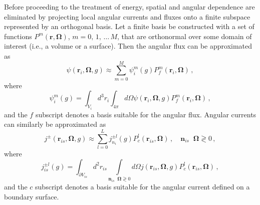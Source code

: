 \documentclass[5p,times,twocolumn,10pt]{elsarticle}
\DeclareMathOperator*{\dotp}{{\scriptscriptstyle \stackrel{\bullet}{{}}}}
\begin{document}
    Before proceeding to the treatment of energy, spatial and angular
dependence
    are eliminated by projecting local angular currents and fluxes onto a
    finite subspace represented by an orthogonal basis. Let a finite basis
    be constructed with a set of functions $P^m(\mathbf{r},\bm{\Omega})$,
    $m=0,\, 1,\, \ldots \, M$, that are orthonormal over some domain of
interest
    (i.e., a volume or a surface). Then the angular flux can be approximated as
    \begin{equation}
        \psi(\mathbf{r}_i, \bm{\Omega}, g)
        \approx \sum^M_{m=0} \psi_{i}^m(g) P^m_f(\mathbf{r}_i,\bm{\Omega}) \, ,
        \label{eq:qexpand}
    \end{equation}
    where
    \begin{equation}
        \psi_{i}^m(g)
        = \int_{V_i}  d^3 r_i \int_{4\pi} d\Omega
        \psi(\mathbf{r}_i, \bm{\Omega}, g)  P^m_f(\mathbf{r}_i,\bm{\Omega}) \, ,
    \end{equation}
    and the $f$ subscript denotes a basis suitable for the angular flux.
    Angular currents can similarly be approximated as
    \begin{equation}
        j^{\pm}(\mathbf{r}_{is}, \bm{\Omega}, g)
        \approx \sum^L_{l=0} j_{n_i}^{\pm l}(g)
        P^l_c(\mathbf{r}_{is},\bm{\Omega}) \, ,
        \quad \mathbf{n}_{is} \dotp \bm{\Omega} \gtrless 0 \, ,
        \label{eq:jexpand}
    \end{equation}
    where
    \begin{equation}
        j_{is}^{\pm l}(g)
        =  \int_{\partial V_{is}} d^2 r_{is}
        \int\limits_{\mathbf{n}_{is} \dotp \bm{\Omega} \gtrless 0} d \Omega
        j(\mathbf{r}_{is}, \bm{\Omega},g)  P^l_c(\mathbf{r}_{is},\bm{\Omega})
\,
        ,
    \end{equation}
    and the $c$ subscript denotes a basis suitable for the angular current
    defined on a boundary surface.
\end{document}
